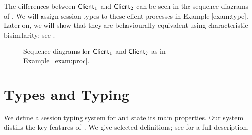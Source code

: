\documentclass[a4paper,UKenglish]{lipics}
\theoremstyle{definition}
\begin{document}
\begin{example}
%
%
%

The differences between $\mathsf{Client}_1$ and $\mathsf{Client}_2$ can be  seen in the sequence diagrams of . 
We will assign session types to these client processes in Example \ref{exam:type}.
Later on, we will show that they are behaviourally equivalent using characteristic bisimilarity;
see .
\begin{figure}

\caption{Sequence diagrams for $\mathsf{Client}_1$ and $\mathsf{Client}_2$ as in Example~\ref{exam:proc}\label{fig:exam}.}
\vspace{-2mm}
\end{figure}
\end{example}



\section{Types and Typing}
\label{sec:types}
\noi %
We define a session typing system for \HOp and state its main properties. 
Our system distills the key features of~\cite{tlca07,MostrousY15}.
We give selected definitions; 
see  for a full description. 

\end{document}
